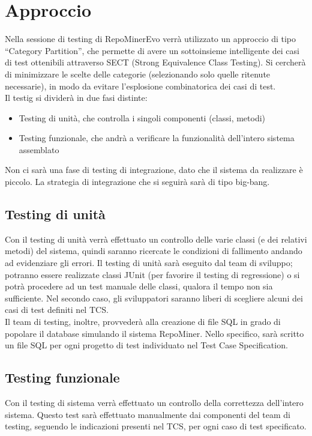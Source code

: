 \chapter{Approccio}
Nella sessione di testing di RepoMinerEvo verrà utilizzato un approccio di tipo ``Category Partition'', che permette di avere un sottoinsieme intelligente dei casi di test ottenibili attraverso SECT (Strong Equivalence Class Testing). Si cercherà di minimizzare le scelte delle categorie (selezionando solo quelle ritenute necessarie), in modo da evitare l'esplosione combinatorica dei casi di test.\\
Il testig si dividerà in due fasi distinte:\\
\begin{itemize}
\item Testing di unità, che controlla i singoli componenti (classi, metodi)\\
\item Testing funzionale, che andrà a verificare la funzionalità dell’intero sistema assemblato\\
\end{itemize}
Non ci sarà una fase di testing di integrazione, dato che il sistema da realizzare è piccolo. La strategia di integrazione che si seguirà sarà di tipo big-bang.
\section{Testing di unità}
Con il testing di unità verrà effettuato un controllo delle varie classi (e dei relativi metodi) del sistema, quindi saranno ricercate le condizioni di fallimento andando ad evidenziare gli errori. Il testing di unità sarà eseguito dal team di sviluppo; potranno essere realizzate classi JUnit (per favorire il testing di regressione) o si potrà procedere ad un test manuale delle classi, qualora il tempo non sia sufficiente. Nel secondo caso, gli sviluppatori saranno liberi di scegliere alcuni dei casi di test definiti nel TCS.\\
Il team di testing, inoltre, provvederà alla creazione di file SQL in grado di popolare il database simulando il sistema RepoMiner. Nello specifico, sarà scritto un file SQL per ogni progetto di test individuato nel Test Case Specification.

\section{Testing funzionale}
Con il testing di sistema verrà effettuato un controllo della correttezza dell’intero sistema. Questo test sarà effettuato manualmente dai componenti del team di testing, seguendo le indicazioni presenti nel TCS, per ogni caso di test specificato.